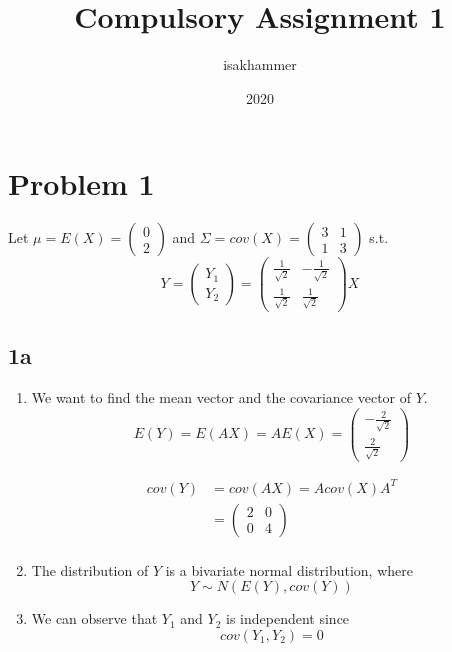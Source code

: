\documentclass{article}
\title{Compulsory Assignment 1}
\author{isakhammer }
\date{2020}
\theoremstyle{remark}
\begin{document}
\maketitle
\tableofcontents
\newpage

\newpage
\section*{Problem 1}%
\label{sec:problem_1}

Let $\mu = E\left( X \right) = \begin{pmatrix}
0 \\
2
\end{pmatrix}
$
and $\Sigma  = cov \left( X \right) = \begin{pmatrix}
3 & 1 \\
1 & 3
\end{pmatrix}
$
s.t. \[
Y = \begin{pmatrix}
Y_{1} \\
Y_{2}
\end{pmatrix}
= \begin{pmatrix}
\frac{1}{\sqrt{2} } & -  \frac{1}{\sqrt{2} } \\
\frac{1}{\sqrt{2} } &  \frac{1}{\sqrt{2} }
\end{pmatrix}X
\]

\subsection*{ 1a}%
\label{sub:_a}

\begin{enumerate}[label=(\roman*)]
    \item We want to find the mean vector and the covariance vector of $Y$.
        \[
        E\left( Y \right) = E\left( AX \right) = AE\left( X \right) = \begin{pmatrix}
    -\frac{2}{\sqrt{2} } \\
    \frac{2}{\sqrt{2} }
    \end{pmatrix}
        \]

    \[
        \begin{split}
        cov\left( Y \right)  &=  cov \left( AX \right) = A cov\left( X \right) A^{T} \\
        &=  \begin{pmatrix}
        2 & 0 \\
        0 & 4
        \end{pmatrix}
         \\
        \end{split}
    \]
\item The distribution of $Y$ is a bivariate normal distribution, where \[
Y \sim  N\left( E\left( Y \right), cov\left( Y \right) \right)
\]
\item We can observe that $Y_{1}$ and $Y_{2}$  is independent since \[
cov \left( Y_{1}, Y_{2} \right) = 0
\]
\end{enumerate}
\end{document}
